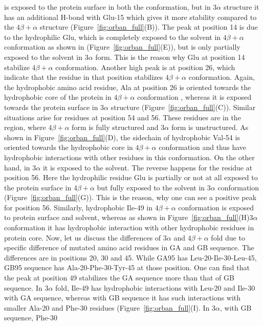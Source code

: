 \documentclass[12pt]{article}
\begin{document}
is exposed to the protein surface in both the conformation, but in $3 \alpha$ structure it has an additional H-bond with Glu-15 which gives
it more stability compared to the $4 \beta + \alpha$ structure (Figure~\ref{fig:orban_full}(B)). The peak 
at position 14 is due to the hydrophilic Glu, which is completely
exposed to the solvent in $4 \beta + \alpha$ conformation as shown in
(Figure~\ref{fig:orban_full}(E)), but is only partially exposed 
to the solvent in $3 \alpha$ form. 
This is the reason why Glu at position 14 stabilize $4 \beta + \alpha$ conformation. Another high peak is at position 26, which indicate
that the residue in that position stabilizes $4 \beta + \alpha$ conformation. Again, the hydrophobic amino acid residue, Ala at position 26
is oriented towards the hydrophobic core of the protein in $4 \beta + \alpha$ conformation , whereas it is exposed towards the protein surface 
in $3 \alpha$ structure (Figure~\ref{fig:orban_full}(C)). Similar situations arise for residues at position 54 and 56. 
These residues are in the region, where $4 \beta + \alpha$ form is fully structured and $3 \alpha$ form is unstructured. 
As shown in Figure~\ref{fig:orban_full}(D), the sidechain of hydrophobic Val-54 is oriented towards the hydrophobic core in 
$4 \beta + \alpha$ conformation and thus have hydrophobic interactions with other residues in this conformation.
On the other hand, in $3 \alpha$ it is exposed to the solvent. The reverse happens for the residue at position 56.
Here the hydrophilic residue Glu is partially or not at all exposed to the protein surface in $4 \beta + \alpha$ but fully exposed 
to the solvent in $3 \alpha$ conformation (Figure~\ref{fig:orban_full}(G)). This is the reason, why one can see a positive peak for position 56. 
Similarly, hydrophobic Ile-49 in $4 \beta + \alpha$ conformation is exposed to protein surface and solvent, whereas as shown in 
Figure~\ref{fig:orban_full}(H)$3 \alpha$ conformation 
it has hydrophobic interaction with other hydrophobic residues in protein core.   
Now, let us discuss the differences of $3 \alpha$ and $4 \beta + \alpha$ fold due to specific difference of mutated amino acid 
residues in GA and GB sequence. The differences are in positions 20, 30 and 45. While GA95 has Leu-20-Ile-30-Leu-45, GB95 sequence 
has Ala-20-Phe-30-Tyr-45 at those position. One can find that the peak at position 49 stabilizes the GA sequence more than that of GB
sequence. In $3 \alpha$ fold, Ile-49 has hydrophobic interactions with Leu-20 and Ile-30 with GA sequence, whereas with GB sequence it 
has such interactions with smaller Ala-20 and Phe-30 residues (Figure~\ref{fig:orban_full}(I). In $3 \alpha$, with GB sequence, Phe-30 
\end{document}
